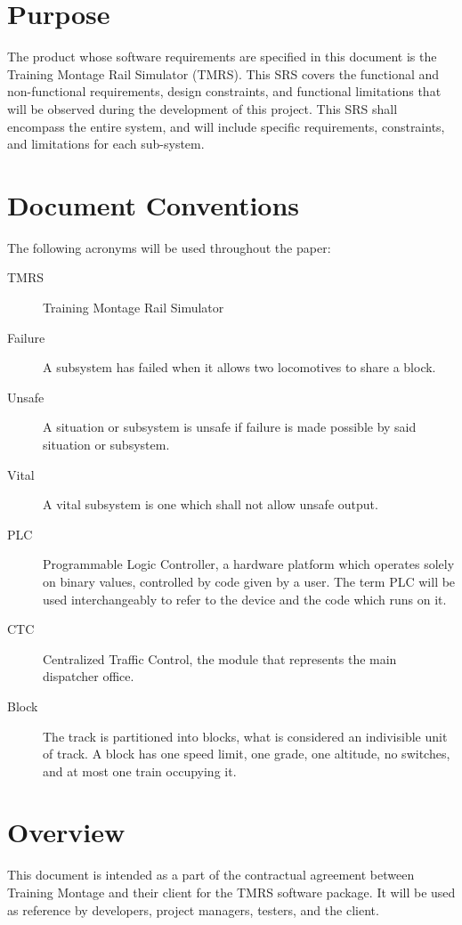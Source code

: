 \documentclass{scrreprt}
\begin{document}
\section{Purpose}
The product whose software requirements are specified in this document is the
Training Montage Rail Simulator (TMRS). This SRS covers the functional and
non-functional requirements, design constraints, and functional limitations that
will be observed during the development of this project. This SRS shall encompass
the entire system, and will include specific requirements, constraints, and
limitations for each sub-system.

\section{Document Conventions}

The following acronyms will be used throughout the paper:

\begin{description}
  \item[TMRS] Training Montage Rail Simulator
  \item[Failure] A subsystem has failed when it allows two locomotives to share a block.
  \item[Unsafe] A situation or subsystem is unsafe if failure is made possible by said situation or subsystem.
  \item[Vital] A vital subsystem is one which shall not allow unsafe output.
  \item[PLC] Programmable Logic Controller, a hardware platform which operates solely on binary values, controlled by code given by a user. The term PLC will be used interchangeably to refer to the device and the code which runs on it.
  \item[CTC] Centralized Traffic Control, the module that represents the main dispatcher office.
  \item[Block] The track is partitioned into blocks, what is considered an indivisible unit of track. A block has one speed limit, one grade, one altitude, no switches, and at most one train occupying it.
\end{description}

\section{Overview}
This document is intended as a part of the contractual agreement between Training
Montage and their client for the TMRS software package. It will be used as reference
by developers, project managers, testers, and the client.
\end{document}
